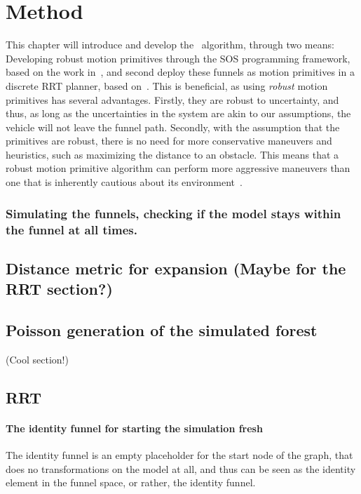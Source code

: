 \chapter{Method}

This chapter will introduce and develop the \rrtfunnel\ algorithm, through two
means: Developing robust motion primitives through the \ac{SOS} programming
framework, based on the work in~\cite{majumdarFunnelLibrariesRealtime2017}, and
second deploy these funnels as motion primitives in a discrete \ac{RRT} planner,
based on~\cite{lavalleLav98cPdf}. This is beneficial, as using \textit{robust}
motion primitives has several advantages. Firstly, they are robust to
uncertainty, and thus, as long as the uncertainties in the system are akin to
our assumptions, the vehicle will not leave the funnel path. Secondly, with the
assumption that the primitives are robust, there is no need for more
conservative maneuvers and heuristics, such as maximizing the distance to an
obstacle. This means that a robust motion primitive algorithm can perform more
aggressive maneuvers than one that is inherently cautious about its
environment~\cite{majumdarFunnelLibrariesRealtime2017}.

\subsection{Simulating the funnels, checking if the model stays within the
  funnel at all times.}

\section{Distance metric for expansion (Maybe for the RRT section?)}

\section{Poisson generation of the simulated forest} (Cool section!)

\section{RRT}

\subsubsection{The identity funnel for starting the simulation fresh}

The identity funnel is an empty placeholder for the start node of the graph,
that does no transformations on the model at all, and thus can be seen as the
identity element in the funnel space, or rather, the identity funnel.

